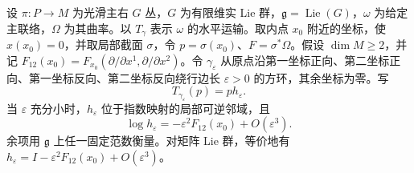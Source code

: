 \begin{proposition}\label{g1:prop:principal-small-loop}
	设 \(\pi:P\to M\) 为光滑主右 \(G\) 丛，\(G\) 为有限维实 Lie 群，\(\mathfrak g=\operatorname{Lie}(G)\)，\(\omega\) 为给定主联络，\(\Omega\) 为其曲率。以 \(T_\gamma\) 表示 \(\omega\) 的水平运输。取内点 \(x_0\) 附近的坐标，使 \(x(x_0)=0\)，并取局部截面 \(\sigma\)，令 \(p=\sigma(x_0)\)、\(F=\sigma^*\Omega\)。假设 \(\dim M\ge2\)，并记 \(F_{12}(x_0)=F_{x_0}(\partial/\partial x^1,\partial/\partial x^2)\)。令 \(\gamma_\varepsilon\) 从原点沿第一坐标正向、第二坐标正向、第一坐标反向、第二坐标反向绕行边长 \(\varepsilon>0\) 的方环，其余坐标为零。写
	\[
		T_{\gamma_\varepsilon}(p)=p h_\varepsilon.
	\]
	当 \(\varepsilon\) 充分小时，\(h_\varepsilon\) 位于指数映射的局部可逆邻域，且
	\begin{equation}\label{g1:eq:principal-small-loop}
		\log h_\varepsilon=-\varepsilon^2F_{12}(x_0)+O(\varepsilon^3).
	\end{equation}
	余项用 \(\mathfrak g\) 上任一固定范数衡量。对矩阵 Lie 群，等价地有 \(h_\varepsilon=I-\varepsilon^2F_{12}(x_0)+O(\varepsilon^3)\)。
\end{proposition}
